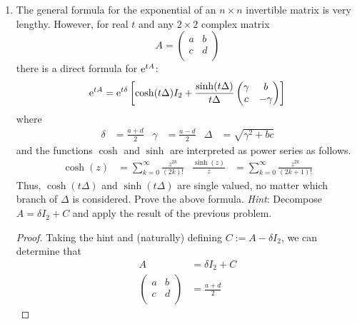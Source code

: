 \documentclass[../psets.tex]{subfiles}
\begin{document}
\begin{enumerate}
\begin{enumerate}
\begin{proof}
        \end{proof}
    \end{enumerate}
    \item The general formula for the exponential of an $n\times n$ invertible matrix is very lengthy. However, for real $t$ and any $2\times 2$ complex matrix
    \begin{equation*}
        A =
        \begin{pmatrix}
            a & b\\
            c & d\\
        \end{pmatrix}
    \end{equation*}
    there is a direct formula for $\e[tA]$:
    \begin{equation*}
        \e[tA] = \e[t\delta]\left[ \cosh(t\Delta)I_2+\frac{\sinh(t\Delta)}{t\Delta}
            \begin{pmatrix}
                \gamma & b\\
                c & -\gamma\\
            \end{pmatrix}
        \right]
    \end{equation*}
    where
    \begin{align*}
        \delta &= \frac{a+d}{2}&
        \gamma &= \frac{a-d}{2}&
        \Delta &= \sqrt{\gamma^2+bc}
    \end{align*}
    and the functions $\cosh$ and $\sinh$ are interpreted as power series as follows.
    \begin{align*}
        \cosh(z) &= \sum_{k=0}^\infty\frac{z^{2k}}{(2k)!}&
        \frac{\sinh(z)}{z} &= \sum_{k=0}^\infty\frac{z^{2k}}{(2k+1)!}
    \end{align*}
    Thus, $\cosh(t\Delta)$ and $\sinh(t\Delta)$ are single valued, no matter which branch of $\Delta$ is considered. Prove the above formula. \emph{Hint}: Decompose $A=\delta I_2+C$ and apply the result of the previous problem.
    \begin{proof}
        Taking the hint and (naturally) defining $C:=A-\delta I_2$, we can determine that
        \begin{align*}
            A &= \delta I_2+C\\
            \begin{pmatrix}
                a & b\\
                c & d\\
            \end{pmatrix}
            &= \frac{a+d}{2}

\end{align*}
\end{proof}
\end{enumerate}
\end{document}
